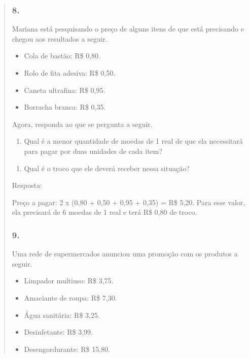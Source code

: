 \begin{enumerate}
\begin{escolha}
\begin{enumerate}
\begin{itemize}
\begin{itemize}
\begin{escolha}
\begin{quote}
\begin{escolha}
\subsubsection{8.}\label{section-72}

Mariana está pesquisando o preço de alguns itens de que está precisando e chegou aos resultados a seguir.

\begin{itemize}
  \item Cola de bastão: R\$ 0,80.
  \item Rolo de fita adesiva: R\$ 0,50.
  \item Caneta ultrafina: R\$ 0,95.
  \item Borracha branca: R\$ 0,35.
\end{itemize}

Agora, responda ao que se pergunta a seguir.

\begin{enumerate}
\def\labelenumi{\alph{enumi})}
\item
  Qual é a menor quantidade de moedas de 1 real de que ela necessitará para
  pagar por duas unidades de cada item?
\end{enumerate}

\begin{enumerate}
\def\labelenumi{\alph{enumi})}
\item
  Qual é o troco que ele deverá receber nessa situação?
\end{enumerate}

Resposta:

Preço a pagar: 2 x (0,80 + 0,50 + 0,95 + 0,35) = R\$ 5,20. Para esse
valor, ela precisará de 6 moedas de 1 real e terá R\$ 0,80 de troco.

\subsubsection{9.}\label{section-73}

Uma rede de supermercados anunciou uma promoção com os produtos a seguir.

\begin{itemize}
  \item Limpador multiuso: R\$ 3,75.
  \item Amaciante de roupa: R\$ 7,30.
  \item Água sanitária: R\$ 3,25.
  \item Desinfetante: R\$ 3,99.
  \item Desengordurante: R\$ 15,80.
\end{itemize}


\end{escolha}
\end{quote}
\end{escolha}
\end{itemize}
\end{itemize}
\end{enumerate}
\end{escolha}
\end{enumerate}
